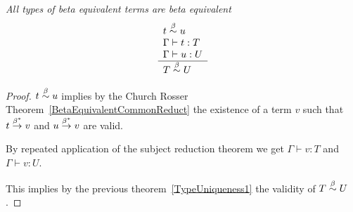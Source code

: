 \begin{theorem}
    \label{TypeUniqueness2}
    \emph{All types of beta equivalent terms are beta equivalent}
    $$
    \begin{array}{l} 
        t \stackrel{\beta}{\sim} u
        \\
        \Gamma \vdash t : T
        \\
        \Gamma \vdash u : U
     \\ \hline 
        T \stackrel{\beta}{\sim} U
    \end{array}
    $$

    \begin{proof}
        $ t \stackrel{\beta}{\sim} u$ implies by the Church Rosser
        Theorem~\ref{BetaEquivalentCommonReduct} the existence of a term $v$
        such that $t \stackrel{\beta^*}{\to} v$ and $u \stackrel{\beta^*}{\to} v$ are valid.

        By repeated application of the subject reduction theorem we get $\Gamma
        \vdash v : T$ and $\Gamma \vdash v : U$.

        This implies by the previous theorem~\ref{TypeUniqueness1} the validity
        of $T \stackrel{\beta}{\sim} U$.
    \end{proof}
\end{theorem}
